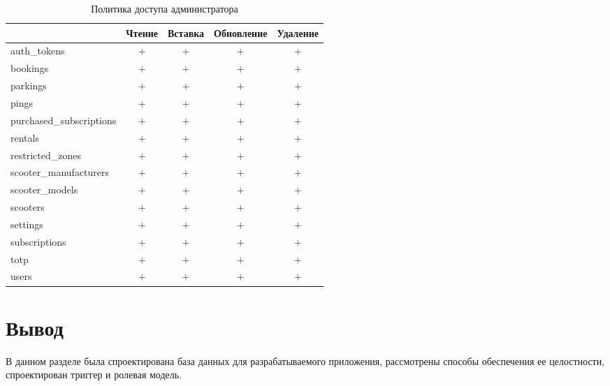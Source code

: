 \begin{table}[H]
	\begin{threeparttable}[b]
		\caption{Политика доступа администратора}
		\label{tbl:admin-policy}
		{\renewcommand{\arraystretch}{1.2}
			\begin{tabularx}{\textwidth}
				{
					| >{\raggedright\arraybackslash}X
					| >{\centering\arraybackslash}c
					| >{\centering\arraybackslash}c
					| >{\centering\arraybackslash}c
					| >{\centering\arraybackslash}c |
				}
				\hline
				                         & \textbf{Чтение} & \textbf{Вставка} & \textbf{Обновление} & \textbf{Удаление} \\
				\hline
				auth\_tokens             & $+$             & $+$              & $+$                 & $+$               \\
				\hline
				bookings                 & $+$             & $+$              & $+$                 & $+$               \\
				\hline
				parkings                 & $+$             & $+$              & $+$                 & $+$               \\
				\hline
				pings                    & $+$             & $+$              & $+$                 & $+$               \\
				\hline
				purchased\_subscriptions & $+$             & $+$              & $+$                 & $+$               \\
				\hline
				rentals                  & $+$             & $+$              & $+$                 & $+$               \\
				\hline
				restricted\_zones        & $+$             & $+$              & $+$                 & $+$               \\
				\hline
				scooter\_manufacturers   & $+$             & $+$              & $+$                 & $+$               \\
				\hline
				scooter\_models          & $+$             & $+$              & $+$                 & $+$               \\
				\hline
				scooters                 & $+$             & $+$              & $+$                 & $+$               \\
				\hline
				settings                 & $+$             & $+$              & $+$                 & $+$               \\
				\hline
				subscriptions            & $+$             & $+$              & $+$                 & $+$               \\
				\hline
				totp                     & $+$             & $+$              & $+$                 & $+$               \\
				\hline
				users                    & $+$             & $+$              & $+$                 & $+$               \\
				\hline
			\end{tabularx}}
	\end{threeparttable}
\end{table}

\section*{Вывод}

В данном разделе была спроектирована база данных для разрабатываемого приложения, рассмотрены способы обеспечения ее целостности, спроектирован триггер и ролевая модель.